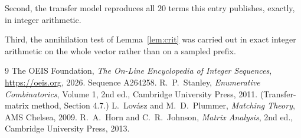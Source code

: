 \documentclass[11pt,a4paper]{article}
\theoremstyle{plain}
\theoremstyle{definition}
\begin{document}
Second, the transfer model reproduces all $20$ terms this entry publishes, exactly, in
integer arithmetic.

Third, the annihilation test of Lemma~\ref{lem:crit} was carried out in exact integer
arithmetic on the whole vector rather than on a sampled prefix.

\begin{thebibliography}{9}
 The OEIS Foundation, \emph{The On-Line Encyclopedia of Integer
Sequences}, \url{https://oeis.org}, 2026. Sequence A264258.
 R.~P.~Stanley, \emph{Enumerative Combinatorics}, Volume 1, 2nd ed.,
Cambridge University Press, 2011. (Transfer-matrix method, Section 4.7.)
 L.~Lov\'asz and M.~D.~Plummer, \emph{Matching Theory}, AMS Chelsea, 2009.
 R.~A.~Horn and C.~R.~Johnson, \emph{Matrix Analysis}, 2nd ed., Cambridge
University Press, 2013.
\end{thebibliography}
\end{document}
